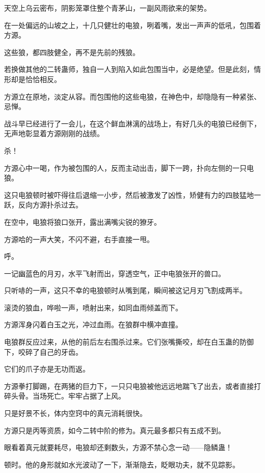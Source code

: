 
\begin{this_body}

天空上乌云密布，阴影笼罩住整个青茅山，一副风雨欲来的架势。

在一处偏远的山坡之上，十几只健壮的电狼，咧着嘴，发出一声声的低吼，包围着方源。

这些狼，都四肢健全，再不是先前的残狼。

若换做其他的二转蛊师，独自一人到陷入如此包围当中，必是绝望。但是此刻，情形却是恰恰相反。

方源立在原地，淡定从容。而包围他的这些电狼，在神色中，却隐隐有一种紧张、忌惮。

战斗早已经进行了一会儿，在这个鲜血淋漓的战场上，有好几头的电狼已经倒下，无声地彰显着方源刚刚的战绩。

杀！

方源心中一喝，作为被包围的人，反而主动出击，脚下一跨，扑向左侧的一只电狼。

这只电狼顿时被吓得往后退缩一小步，然后被激发了凶性，矫健有力的四肢猛地一跃，反向方源扑杀过去。

在空中，电狼将狼口张开，露出满嘴尖锐的獠牙。

方源哈的一声大笑，不闪不避，右手直接一甩。

呼。

一记幽蓝色的月刃，水平飞射而出，穿透空气，正中电狼张开的兽口。

只听哧的一声，这只不幸的电狼顿时从嘴到尾，瞬间被这记月刃飞割成两半。

滚烫的狼血，哗啦一声，喷射出来，如同血雨倾盖而下。

方源浑身闪着白玉之光，冲过血雨。在狼群中横冲直撞。

电狼群反应过来，从他的前后左右围杀过来。它们张嘴撕咬，却在白玉蛊的防御下，咬碎了自己的牙齿。

它们的爪子亦是无功而返。

方源拳打脚踢，在两猪的巨力下，一只只电狼被他远远地踹飞了出去，或者直接打碎头骨。当场死亡。牢牢占据了上风。

只是好景不长，体内空窍中的真元消耗很快。

方源只是丙等资质，如今二转中阶的修为。真元最多都只有五成不到。

眼看着真元就要耗尽，电狼却还剩数头，方源不禁心念一动——隐鳞蛊！

顿时。他的身形就如水光波动了一下，渐渐隐去，眨眼功夫，就不见踪影。


\end{this_body}
